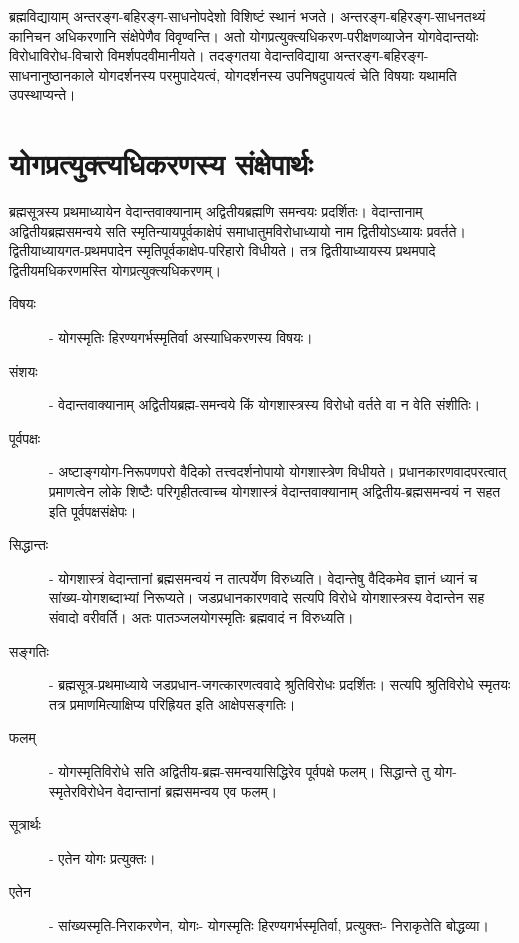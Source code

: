 ब्रह्मविद्यायाम् अन्तरङ्ग-बहिरङ्ग-साधनोपदेशो विशिष्टं स्थानं भजते। अन्तरङ्ग-बहिरङ्ग-साधनतथ्यं कानिचन अधिकरणानि संक्षेपेणैव विवृण्वन्ति। अतो योगप्रत्युक्त्यधिकरण-परीक्षणव्याजेन योगवेदान्तयोः विरोधाविरोध-विचारो विमर्शपदवीमानीयते। तदङ्गतया वेदान्तविद्याया अन्तरङ्ग-बहिरङ्ग-साधनानुष्ठानकाले योगदर्शनस्य परमुपादेयत्वं, योगदर्शनस्य उपनिषदुपायत्वं चेति विषयाः यथामति उपस्थाप्यन्ते।

\section*{योगप्रत्युक्त्यधिकरणस्य संक्षेपार्थः}

ब्रह्मसूत्रस्य प्रथमाध्यायेन वेदान्तवाक्यानाम् अद्वितीयब्रह्मणि समन्वयः प्रदर्शितः। वेदान्तानाम् अद्वितीयब्रह्मसमन्वये सति स्मृतिन्यायपूर्वकाक्षेपं समाधातुमविरोधाध्यायो नाम द्वितीयोऽध्यायः प्रवर्तते। द्वितीयाध्यायगत-प्रथमपादेन स्मृतिपूर्वकाक्षेप-परिहारो विधीयते। तत्र द्वितीयाध्यायस्य प्रथमपादे द्वितीयमधिकरणमस्ति योगप्रत्युक्त्यधिकरणम्।

\begin{description}
\item[विषयः] - योगस्मृतिः हिरण्यगर्भस्मृतिर्वा अस्याधिकरणस्य विषयः।
\item[संशयः] - वेदान्तवाक्यानाम् अद्वितीयब्रह्म-समन्वये किं योगशास्त्रस्य विरोधो वर्तते वा न वेति संशीतिः।
\item[पूर्वपक्षः] - अष्टाङ्गयोग-निरूपणपरो वैदिको तत्त्वदर्शनोपायो योगशास्त्रेण विधीयते। प्रधानकारणवादपरत्वात् प्रमाणत्वेन लोके शिष्टैः परिगृहीतत्वाच्च योगशास्त्रं वेदान्तवाक्यानाम् अद्वितीय-ब्रह्मसमन्वयं न सहत इति पूर्वपक्षसंक्षेपः।
\item[सिद्धान्तः] - योगशास्त्रं वेदान्तानां ब्रह्मसमन्वयं न तात्पर्येण विरुध्यति। वेदान्तेषु वैदिकमेव ज्ञानं ध्यानं च सांख्य-योगशब्दाभ्यां निरूप्यते। जडप्रधानकारणवादे सत्यपि विरोधे योगशास्त्रस्य वेदान्तेन सह संवादो वरीवर्ति। अतः पातञ्जलयोगस्मृतिः ब्रह्मवादं न विरुध्यति।
\item[सङ्गतिः] - ब्रह्मसूत्र-प्रथमाध्याये जडप्रधान-जगत्कारणत्ववादे श्रुतिविरोधः प्रदर्शितः। सत्यपि श्रुतिविरोधे स्मृतयः तत्र प्रमाणमित्याक्षिप्य परिह्रियत इति आक्षेपसङ्गतिः।
\item[फलम्] - योगस्मृतिविरोधे सति अद्वितीय-ब्रह्म-समन्वयासिद्धिरेव पूर्वपक्षे फलम्। सिद्धान्ते तु योग-स्मृतेरविरोधेन वेदान्तानां ब्रह्मसमन्वय एव फलम्।
\item[सूत्रार्थः] - एतेन योगः प्रत्युक्तः।
\item[एतेन] - सांख्यस्मृति-निराकरणेन, योगः- योगस्मृतिः हिरण्यगर्भस्मृतिर्वा, प्रत्युक्तः- निराकृतेति बोद्धव्या।
\end{description}

